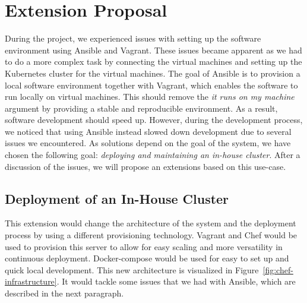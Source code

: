 \section{Extension Proposal}
During the project, we experienced issues with setting up the software environment using Ansible and Vagrant. These issues became apparent as we had to do a more complex task by connecting the virtual machines and setting up the Kubernetes cluster for the virtual machines. The goal of Ansible is to provision a local software environment together with Vagrant, which enables the software to run locally on virtual machines. This should remove the \textit{it runs on my machine} argument by providing a stable and reproducible environment. As a result, software development should speed up. However, during the development process, we noticed that using Ansible instead slowed down development due to several issues we encountered. As solutions depend on the goal of the system, we have chosen the following goal: \textit{deploying and maintaining an in-house cluster}. After a discussion of the issues, we will propose an extensions based on this use-case. 
\subsection{Deployment of an In-House Cluster}
This extension would change the architecture of the system and the deployment process by using a different provisioning technology. Vagrant and Chef would be used to provision this server to allow for easy scaling and more versatility in continuous deployment.  Docker-compose would be used for easy to set up and quick local development. This new architecture is visualized in Figure~\ref{fig:chef-infrastructure}. It would tackle some issues that we had with Ansible, which are described in the next paragraph.

